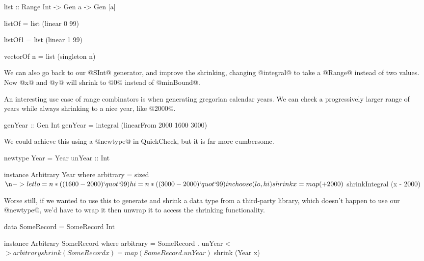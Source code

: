 \begin{code}
  list :: Range Int -> Gen a -> Gen [a]

  listOf =
    list (linear 0 99)

  listOf1 =
    list (linear 1 99)

  vectorOf n =
    list (singleton n)
\end{code}

We can also go back to our @SInt@ generator, and improve the shrinking, changing @integral@ to take a @Range@ instead of two values. Now @x@ and @y@ will shrink to @0@ instead of @minBound@.


An interesting use case of range combinators is when generating gregorian calendar years. We can check a progressively larger range of years while always shrinking to a nice year, like @2000@.

\begin{code}
  genYear :: Gen Int
  genYear =
    integral (linearFrom 2000 1600 3000)
\end{code}

We could achieve this using a @newtype@ in QuickCheck, but it is far more cumbersome.

\begin{code}
  newtype Year =
    Year {
        unYear :: Int
      }

  instance Arbitrary Year where
    arbitrary =
      sized $ \n ->
        let
          lo = n * ((1600 - 2000) `quot` 99)
          hi = n * ((3000 - 2000) `quot` 99)
        in
          choose (lo, hi)

    shrink x =
      map (+ 2000) $ shrinkIntegral (x - 2000)
\end{code}

Worse still, if we wanted to use this to generate and shrink a data type from a third-party library, which doesn't happen to use our @newtype@, we'd have to wrap it then unwrap it to access the shrinking functionality.

\begin{code}
  data SomeRecord =
    SomeRecord Int

  instance Arbitrary SomeRecord where
    arbitrary =
      SomeRecord . unYear <$> arbitrary

    shrink (SomeRecord x) =
      map (SomeRecord . unYear) $ shrink (Year x)
\end{code}


